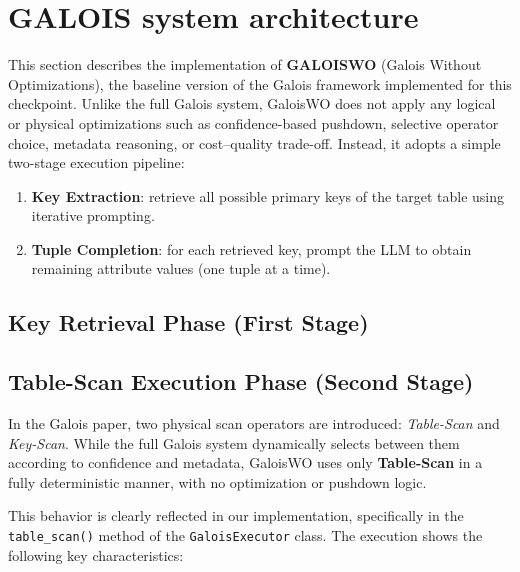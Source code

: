 \section{GALOIS system architecture}
This section describes the implementation of \textbf{GALOISWO} (Galois Without Optimizations), the baseline version of the Galois framework implemented for this checkpoint. Unlike the full Galois system, GaloisWO does not apply any logical or physical optimizations such as confidence-based pushdown, selective operator choice, metadata reasoning, or cost–quality trade-off. Instead, it adopts a simple two-stage execution pipeline:

\begin{enumerate}
    \item \textbf{Key Extraction}: retrieve all possible primary keys of the target table using iterative prompting.
    \item \textbf{Tuple Completion}: for each retrieved key, prompt the LLM to obtain remaining attribute values (one tuple at a time).
\end{enumerate}


\subsection{Key Retrieval Phase (First Stage)}

\subsection{Table-Scan Execution Phase (Second Stage)}
In the Galois paper, two physical scan operators are introduced: \textit{Table-Scan}
and \textit{Key-Scan}. While the full Galois system dynamically selects between
them according to confidence and metadata, GaloisWO uses only \textbf{Table-Scan}
in a fully deterministic manner, with no optimization or pushdown logic.

This behavior is clearly reflected in our implementation,
specifically in the \texttt{table\_scan()} method of the
\texttt{GaloisExecutor} class. The execution shows the following key characteristics:

